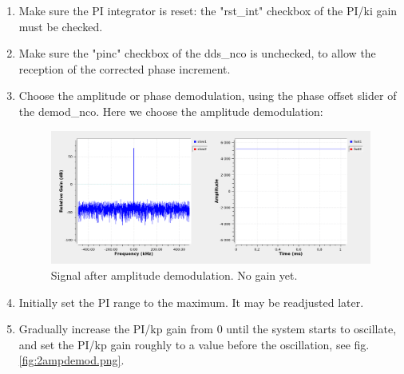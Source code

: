 \documentclass[12pt,oneside]{article}
\begin{document}
\vspace{0.3cm}
\begin{enumerate}
	\setlength\itemsep{-0.1cm}
	\item Make sure the PI integrator is reset: the "rst\_int" checkbox of the PI/ki gain must be checked.
	\item Make sure the "pinc" checkbox of the dds\_nco is unchecked, to allow the reception of the corrected phase increment.
	\item Choose the amplitude or phase demodulation, using the phase offset slider of the demod\_nco. Here we choose the amplitude demodulation:
	
\begin{figure}[h!tb]
	\begin{center}
		\vspace{0.5cm}
		\includegraphics[width=13cm,trim={0cm 0cm 0cm 0cm}, clip]{figures/1ampdemod.png}
		\caption{Signal after amplitude demodulation. No gain yet.}
		\label{fig:1ampdemod.png}
	\end{center}
\end{figure}	
	
	\item Initially set the PI range to the maximum. It may be readjusted later.
	\item Gradually increase the PI/kp gain from $0$ until the system starts to oscillate, and set the PI/kp gain roughly to a value before the oscillation, see fig.\ref{fig:2ampdemod.png}.
	

\end{enumerate}
\end{document}
